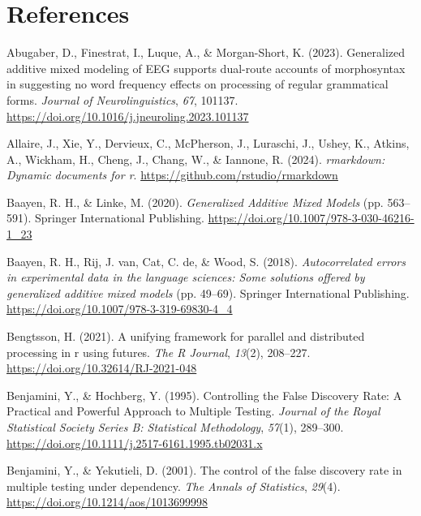 \documentclass[
  doc,
  floatsintext,
  longtable,
  a4paper,
  nolmodern,
  notxfonts,
  notimes,
  donotrepeattitle,
  colorlinks=true,linkcolor=blue,citecolor=blue,urlcolor=blue]{apa7}
\newlength{\cslhangindent}
\newenvironment{CSLReferences}[2] %
 {\begin{list}{}{%
  \setlength{\itemindent}{0pt}
  \setlength{\leftmargin}{0pt}
  \setlength{\parsep}{0pt}
  \ifodd #1
   \setlength{\leftmargin}{\cslhangindent}
   \setlength{\itemindent}{-1\cslhangindent}
  \fi
  \setlength{\itemsep}{#2\baselineskip}}}
 {\end{list}}
\begin{document}
\newpage

\section{References}\label{references}

\label{refs}
\begin{CSLReferences}{1}{0}
Abugaber, D., Finestrat, I., Luque, A., \& Morgan-Short, K. (2023).
Generalized additive mixed modeling of EEG supports dual-route accounts
of morphosyntax in suggesting no word frequency effects on processing of
regular grammatical forms. \emph{Journal of Neurolinguistics},
\emph{67}, 101137.
\url{https://doi.org/10.1016/j.jneuroling.2023.101137}

Allaire, J., Xie, Y., Dervieux, C., McPherson, J., Luraschi, J., Ushey,
K., Atkins, A., Wickham, H., Cheng, J., Chang, W., \& Iannone, R.
(2024). \emph{{rmarkdown}: Dynamic documents for r}.
\url{https://github.com/rstudio/rmarkdown}

Baayen, R. H., \& Linke, M. (2020). \emph{Generalized Additive Mixed
Models} (pp. 563--591). Springer International Publishing.
\url{https://doi.org/10.1007/978-3-030-46216-1_23}

Baayen, R. H., Rij, J. van, Cat, C. de, \& Wood, S. (2018).
\emph{Autocorrelated errors in experimental data in the language
sciences: Some solutions offered by generalized additive mixed models}
(pp. 49--69). Springer International Publishing.
\url{https://doi.org/10.1007/978-3-319-69830-4_4}

Bengtsson, H. (2021). A unifying framework for parallel and distributed
processing in r using futures. \emph{The R Journal}, \emph{13}(2),
208--227. \url{https://doi.org/10.32614/RJ-2021-048}

Benjamini, Y., \& Hochberg, Y. (1995). Controlling the False Discovery
Rate: A Practical and Powerful Approach to Multiple Testing.
\emph{Journal of the Royal Statistical Society Series B: Statistical
Methodology}, \emph{57}(1), 289--300.
\url{https://doi.org/10.1111/j.2517-6161.1995.tb02031.x}

Benjamini, Y., \& Yekutieli, D. (2001). The control of the false
discovery rate in multiple testing under dependency. \emph{The Annals of
Statistics}, \emph{29}(4). \url{https://doi.org/10.1214/aos/1013699998}


\end{CSLReferences}
\end{document}
